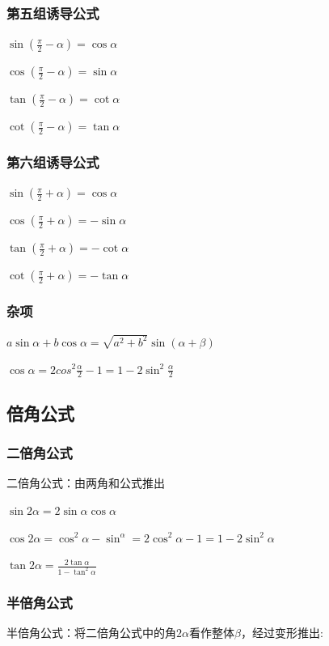 \documentclass[UTF8]{ctexbook}
\begin{document}
{{{  \subsubsection{第五组诱导公式}{
    $\sin(\frac{\pi}{2} - \alpha) = \cos\alpha$

    $\cos(\frac{\pi}{2} - \alpha) = \sin\alpha$

    $\tan(\frac{\pi}{2} - \alpha) = \cot\alpha$

    $\cot(\frac{\pi}{2} - \alpha) = \tan\alpha$
  }%

  \subsubsection{第六组诱导公式}{
    $\sin(\frac{\pi}{2} + \alpha) = \cos\alpha$

    $\cos(\frac{\pi}{2} + \alpha) = -\sin\alpha$

    $\tan(\frac{\pi}{2} + \alpha) = -\cot\alpha$

    $\cot(\frac{\pi}{2} + \alpha) = -\tan\alpha$
  }%

  \subsubsection{杂项}{
    $a\sin\alpha + b\cos\alpha = \sqrt{a^2 + b^2}\sin(\alpha+\beta)$

    $\cos\alpha = 2cos^2\frac{\alpha}{2} - 1 = 1-2\sin^2\frac{\alpha}{2}$
  }%

}%

\subsection{倍角公式}{

  \subsubsection{二倍角公式}{
    二倍角公式：由两角和公式推出

    $\sin2\alpha = 2\sin\alpha\cos\alpha$

    $\cos2\alpha = \cos^2\alpha - \sin^\alpha = 2\cos^2\alpha - 1 = 1 - 2\sin^2\alpha$

    $\tan2\alpha = \frac{2\tan\alpha}{1 - \tan^2\alpha}$
  }%

  \subsubsection{半倍角公式}{
    半倍角公式：将二倍角公式中的角$2\alpha$看作整体$\beta$，经过变形推出:

}}}}
\end{document}

